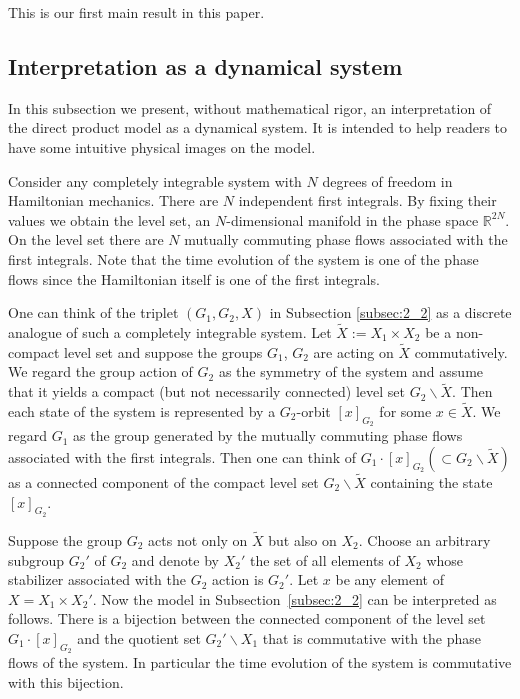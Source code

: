 \documentclass[pdftex]{sigma}
\begin{document}
This is our f\/irst main result in this paper.

\subsection{Interpretation as a dynamical system}\label{subsec:2_3}

In this subsection we present, without mathematical rigor, an interpretation of the direct product model
as a dynamical system.
It is intended to help readers to have some intuitive physical images on the model.


Consider any completely integrable system with $N$ degrees of freedom in Hamiltonian mechanics.
There are $N$ independent f\/irst integrals.
By f\/ixing their values we obtain the level set, an $N$-dimensional manifold in the phase space $\mathbb{R}^{2N}$.
On the level set there are $N$ mutually commuting phase f\/lows associated with the f\/irst integrals.
Note that the time evolution of the system is one of the phase f\/lows since the Hamiltonian itself is one of the f\/irst integrals.


One can think of the triplet $(G_1,G_2,X)$ in Subsection \ref{subsec:2_2} as a discrete analogue of such a completely integrable system.
Let $\tilde{X} := X_1 \times X_2$ be a non-compact level set and suppose
the groups $G_1$, $G_2$ are acting on $\tilde{X}$ commutatively.
We regard the group action of $G_2$ as the symmetry of the system and assume that it yields
a compact (but not necessarily connected) level set $G_2 \backslash \tilde{X}$.
Then each state of the system
is represented by a $G_2$-orbit $[x]_{G_2}$ for some $x \in \tilde{X}$.
We regard $G_1$ as the group generated by the mutually commuting phase f\/lows associated with the f\/irst integrals.
Then one can think of
$G_1 \cdot [x]_{G_2} (\subset G_2 \backslash \tilde{X})$ as a connected component of the compact level set
$G_2 \backslash \tilde{X}$ containing the state $[x]_{G_2}$.

Suppose the group $G_2$ acts not only on $\tilde{X}$ but also on $X_2$.
Choose an arbitrary subgroup $G_2'$ of $G_2$ and denote by $X_2'$ the set of all elements of $X_2$ whose stabilizer
associated with the $G_2$ action is $G_2'$.
Let $x$ be any element of $X = X_1 \times X_2'$.
Now the model in Subsection~\ref{subsec:2_2}
can be interpreted as follows.
There is a bijection between the connected component of the level set
$G_1 \cdot [x]_{G_2}$
and the quotient set $G_2' \backslash X_1$ that is commutative with the phase f\/lows of the system.
In particular the time evolution of the system is commutative with this bijection.
\end{document}
